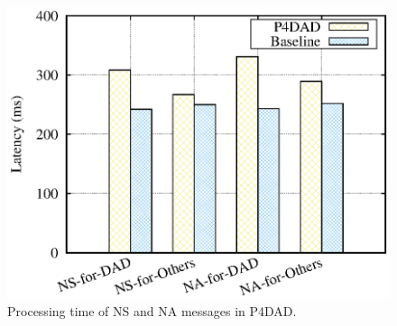 \documentclass[a4paper,fleqn]{cas-dc}
\begin{document}
            \begin{figure}
            \centerline{
                \includegraphics[scale=0.7]{figure/BaselineP4dad.eps}
            }
            \caption{Processing time of NS and NA messages in P4DAD.}
            \label{fig:P4DAD-baseline}
            \end{figure}

\end{document}
